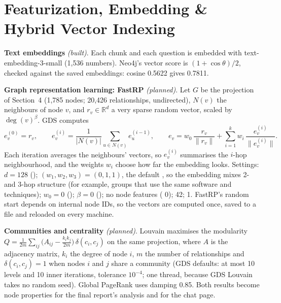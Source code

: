 \documentclass[10pt]{article}
\begin{document}
\section{Featurization, Embedding \& Hybrid Vector Indexing}\label{sec:emb}
\textbf{Text embeddings} \emph{(built)}. Each chunk and each question is embedded with text-embedding-3-small (1,536 numbers). Neo4j's vector score is $(1+\cos\theta)/2$, checked against the saved embeddings: cosine 0.5622 gives 0.7811.

\textbf{Graph representation learning: FastRP} \cite{4} \emph{(planned)}. Let $G$ be the projection of Section~4 (1,785 nodes; 20,426 relationships, undirected), $N(v)$ the neighbours of node $v$, and $r_v \in \mathbb{R}^d$ a very sparse random vector, scaled by $\deg(v)^{\beta}$. GDS computes
\begin{equation*}
e_v^{(0)} = r_v,\qquad e_v^{(i)} = \frac{1}{|N(v)|}\sum_{u \in N(v)} e_u^{(i-1)},\qquad
e_v = w_0\,\frac{r_v}{\lVert r_v\rVert} + \sum_{i=1}^{k} w_i\,\frac{e_v^{(i)}}{\lVert e_v^{(i)}\rVert}.
\end{equation*}
Each iteration averages the neighbours' vectors, so $e_v^{(i)}$ summarises the $i$-hop neighbourhood, and the weights $w_i$ choose how far the embedding looks. Settings: $d = 128$ (); $(w_1, w_2, w_3) = (0, 1, 1)$, the default , so the embedding mixes 2- and 3-hop structure (for example, groups that use the same software and techniques); $w_0 = 0$ (); $\beta = 0$ (); no node features ( 0);  42;  1. FastRP's random start depends on internal node IDs, so the vectors are computed once, saved to a file and reloaded on every machine.

\textbf{Communities and centrality} \emph{(planned)}. Louvain \cite{5} maximises the modularity $Q = \frac{1}{2m}\sum_{ij}\big(A_{ij} - \frac{k_i k_j}{2m}\big)\,\delta(c_i, c_j)$ on the same projection, where $A$ is the adjacency matrix, $k_i$ the degree of node $i$, $m$ the number of relationships and $\delta(c_i, c_j) = 1$ when nodes $i$ and $j$ share a community (GDS defaults: at most 10 levels and 10 inner iterations, tolerance $10^{-4}$; one thread, because GDS Louvain takes no random seed). Global PageRank uses damping 0.85. Both results become node properties for the final report's analysis and for the chat page.
\end{document}
